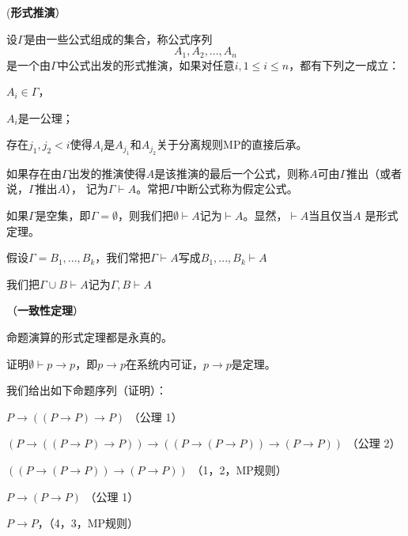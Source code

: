 \begin{defn} (\textbf{形式推演}）

设$\Gamma$是由一些公式组成的集合，称公式序列
$$A_1, A_2,..., A_n$$
是一个由$\Gamma$中公式出发的形式推演，如果对任意$i, 1 \leq i \leq n$，都有下列之一成立：
\begin{tightenum}
 \item $A_i \in \Gamma$，
 \item $A_i$是一公理；
 \item 存在$j_1, j_2 < i$使得$A_i$是$A_{j_1}$和$A_{j_2}$关于分离规则MP的直接后承。
\end{tightenum}
\end{defn}

如果存在由$\Gamma$出发的推演使得$A$是该推演的最后一个公式，则称$A$可由$\Gamma$推出（或者说，$\Gamma$推出$A$），
记为$\Gamma \vdash A$。常把$\Gamma$中断公式称为假定公式。


\begin{note}

\begin{tightenum}
  \item 如果$\Gamma$是空集，即$\Gamma = \emptyset$，则我们把$\emptyset \vdash A$记为$\vdash A$。显然，$\vdash A$当且仅当$A$ 是形式定理。
  \item 假设$\Gamma = {B_1,...,B_k}$，我们常把$\Gamma \vdash A$写成$B_1,...,B_k \vdash A$
  \item 我们把$\Gamma \cup {B} \vdash A$记为$\Gamma, B \vdash A$
\end{tightenum}

\end{note}




\begin{thm}（\textbf{一致性定理}）

命题演算的形式定理都是永真的。
\end{thm}






\begin{exmp}

证明$\emptyset \vdash p \to p$，即$p \to p$在系统内可证，$p \to p$是定理。

我们给出如下命题序列（证明）：
\begin{tightenum}
 \item $ P \to ((P \to P) \to P)$ （公理 1）
 \item $(P \to ((P \to P) \to P)) \to ((P \to (P \to P)) \to (P \to P))$ （公理 2）
 \item $((P \to (P \to P)) \to (P \to P))$ （1，2，MP规则）
 \item  $P \to (P \to P)$ （公理 1）
 \item  $P \to P$，（4，3，MP规则）
\end{tightenum}


\end{exmp}


